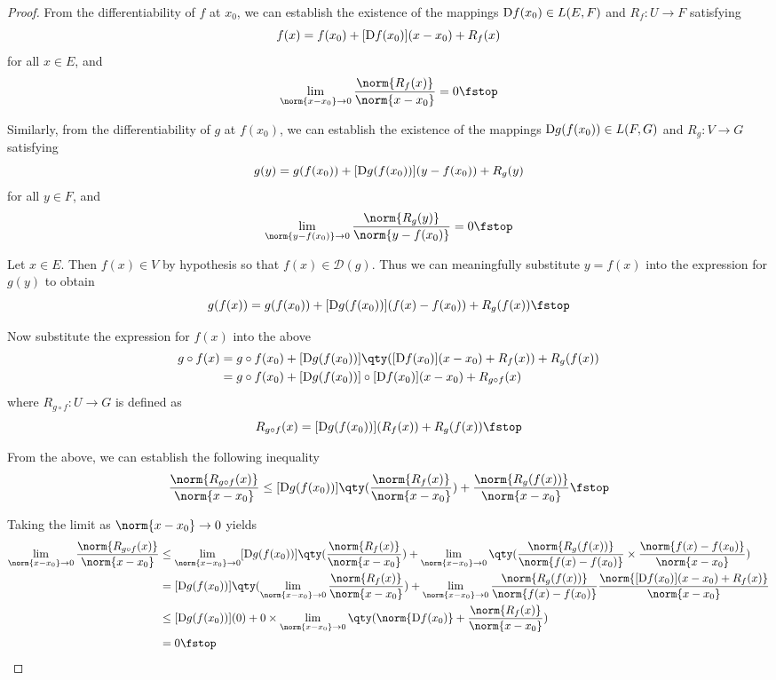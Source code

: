 \begin{proof}
  From the differentiability of \( f \) at \( x_0 \), we can establish the existence of the mappings \( \text{D} f(x_0)\in L(E,F) \) and \( R_f:U\to F \) satisfying
  \[ f(x)=f(x_0)+[\text{D} f(x_0)](x-x_0)+R_f(x) \]
  for all \( x\in E \), and
  \[ \lim_{\norm{x-x_0}\to 0}\frac{\norm{R_f(x)}}{\norm{x-x_0}}=0\fstop \]

  Similarly, from the differentiability of \( g \) at \( f(x_0) \), we can establish the existence of the mappings \( \text{D} g(f(x_0))\in L(F,G) \) and \( R_g:V\to G \) satisfying
  \[ g(y)=g(f(x_0))+[\text{D} g(f(x_0))](y-f(x_0))+R_g(y) \]
  for all \( y\in F \), and
  \[ \lim_{\norm{y-f(x_0)}\to 0}\frac{\norm{R_g(y)}}{\norm{y-f(x_0)}}=0\fstop \]

  Let \( x\in E \). Then \( f(x)\in V \) by hypothesis so that \( f(x)\in\mathcal{D}(g) \). Thus we can meaningfully substitute \( y=f(x) \) into the expression for \( g(y) \) to obtain
  \[ g(f(x))=g(f(x_0))+[\D g(f(x_0))](f(x)-f(x_0))+R_g(f(x))\fstop \]

  Now substitute the expression for \( f(x) \) into the above
  \begin{align*}
    g\circ f(x)&= g\circ f(x_0)+[\D g(f(x_0))]\qty([\D f(x_0)](x-x_0)+R_f(x))+R_g(f(x))\\
    &= g\circ f(x_0)+[\D g(f(x_0))]\circ[\D f(x_0)](x-x_0)+R_{g\circ f}(x)
  \end{align*}
  where \( R_{g\circ f}:U\to G \) is defined as
  \[ R_{g\circ f}(x)=[\D g(f(x_0))](R_f(x))+R_g(f(x))\fstop \]

  From the above, we can establish the following inequality
  \[ \frac{\norm{R_{g\circ f}(x)}}{\norm{x-x_0}}\leq [\D g(f(x_0))]\qty(\frac{\norm{R_f(x)}}{\norm{x-x_0}})+\frac{\norm{R_g(f(x))}}{\norm{x-x_0}}\fstop \]

  Taking the limit as \( \norm{x-x_0}\to 0 \) yields
  \begin{align*}
    \lim_{\norm{x-x_0}\to 0}\frac{\norm{R_{g\circ f}(x)}}{\norm{x-x_0}}&\leq \lim_{\norm{x-x_0}\to 0}[\D g(f(x_0))]\qty(\frac{\norm{R_f(x)}}{\norm{x-x_0}})+\lim_{\norm{x-x_0}\to 0}\qty(\frac{\norm{R_g(f(x))}}{\norm{f(x)-f(x_0)}}\times\frac{\norm{f(x)-f(x_0)}}{\norm{x-x_0}})\\
    &= [\D g(f(x_0))]\qty(\lim_{\norm{x-x_0}\to 0}\frac{\norm{R_f(x)}}{\norm{x-x_0}})+\lim_{\norm{x-x_0}\to 0}\frac{\norm{R_g(f(x))}}{\norm{f(x)-f(x_0)}}\frac{\norm{[\D f(x_0)](x-x_0)+R_f(x)}}{\norm{x-x_0}}\\
    &\leq [\D g(f(x_0))](0)+0\times\lim_{\norm{x-x_0}\to 0}\qty(\norm{\D f(x_0)}+\frac{\norm{R_f(x)}}{\norm{x-x_0}})\\
    &= 0\fstop
  \end{align*}


\end{proof}
